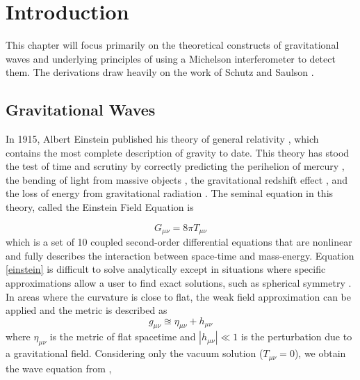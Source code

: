 	\chapter{Introduction}\label{intro}

	This chapter will focus primarily on the theoretical constructs of gravitational waves and underlying principles of using a Michelson interferometer to detect them. The derivations draw heavily on the work of Schutz \cite{SchutzGR} and Saulson \cite{Saulson}.

	\section{Gravitational Waves}\label{gravitational waves}
	In 1915, Albert Einstein published his theory of general relativity \cite{einstein}, which contains the most complete description of gravity to date.  This theory has stood the test of time and scrutiny by correctly predicting the perihelion of mercury \cite{Einstein_GR}, the bending of light from massive objects \cite{DysonEddington}, the gravitational redshift effect \cite{Grav_redshift},  and the loss of energy from gravitational radiation \cite{HulseTaylor}. The seminal equation in this theory, called the Einstein Field Equation is
	
	\begin{equation} \label{einstein}
	G_{\mu \nu} = 8 \pi T_{\mu \nu}
	\end{equation}
	which is a set of 10 coupled second-order differential equations that are nonlinear and fully describes the interaction between space-time and mass-energy. Equation \ref{einstein} is difficult to solve analytically except in situations where specific approximations allow a user to find exact  solutions, such as spherical symmetry \cite{carroll_2003} \cite{schutz_2009}. In areas where the curvature is close to flat,  the weak field approximation can be applied and the metric is described as	
	\begin{equation} \label{weak}
	g_{\mu \nu}  \approxeq \eta_{\mu \nu} + h_{\mu \nu}
	\end{equation}
	where $\eta_{\mu \nu}$ is the metric of flat spacetime and $|h_{\mu \nu}| \ll 1$ is the perturbation due to a gravitational field.	Considering only the vacuum solution ($T_{\mu\nu} = 0$), we obtain the wave equation from \cite{SchutzGR},
	
